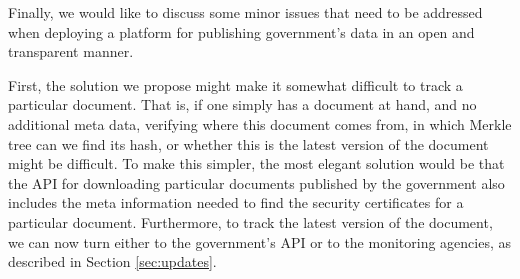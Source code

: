 	
Finally, we would like to discuss some minor issues that need to be addressed when deploying a platform for publishing government's data in an  open and transparent manner.

First, the solution we propose might make it somewhat difficult to track a particular document. That is, if one simply has a document at hand, and no additional meta data, verifying where this document comes from, in which Merkle tree can we find its hash, or whether this is the latest version of the document might be difficult. To make this simpler, the most elegant solution would be that the API for downloading particular documents published by the government also includes the meta information needed to find the security certificates for a particular document. Furthermore, to track the latest version of the document, we can now turn either to the government's API or to the monitoring agencies, as described in Section \ref{sec:updates}.



